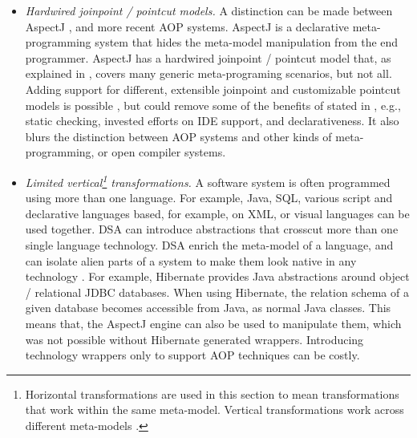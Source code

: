 \begin{itemize}
\item \textit{Hardwired joinpoint / pointcut models.} A distinction can be made between AspectJ \cite{Laddad.aop, www.aspectjt}, and more recent AOP systems. AspectJ is a declarative meta-pro\-gramm\-ing system that hides the meta-model manipulation from the end programmer. AspectJ has a hardwired joinpoint / pointcut model that, as explained in , covers many generic meta-programing scenarios, but not all. Adding support for different, extensible joinpoint and customizable pointcut models is possible \cite{www.abc,josh.04}, but could remove some of the benefits of stated in , e.g., static checking, invested efforts on IDE support, and declarativeness. It also blurs the distinction between AOP systems and other kinds of meta-programming, or open compiler systems. %

\item \textit{Limited vertical\footnote{Horizontal transformations are used in this section to mean transformations that work within the same meta-model. Vertical transformations work across different meta-models \cite{sf.04} .} transformations.} A software system is often programmed using more than one language. For example, Java, SQL, various script and declarative languages based, for example, on XML, or visual languages can be used together. DSA can introduce abstractions that crosscut more than one single language technology. DSA enrich the meta-model of a language, and can isolate alien parts of a system to make them look native in any technology \cite{riel.96}. For example, Hibernate \cite{hibernate} provides Java abstractions around object / relational JDBC \cite{www.jdbc} databases. When using Hibernate, the relation schema of a given database becomes accessible from Java, as normal Java classes. This means that, the AspectJ engine can also be used to manipulate them, which was not possible without Hibernate generated wrappers. Introducing technology wrappers only to support AOP techniques can be costly.


\end{itemize}
